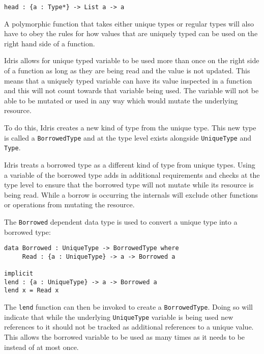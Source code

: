 \documentclass[onehalf,11pt]{beavtex}
\begin{document}
\begin{verbatim}
head : {a : Type*} -> List a -> a
\end{verbatim}

A polymorphic function that takes either unique types or regular types will also
have to obey the rules for how values that are uniquely typed can be used
on the right hand side of a function.


Idris allows for unique typed variable to be used more than once on the right
side of a function as long as they are being read and the value is not
updated.
This means that a uniquely typed variable can have its value inspected in a
function and this will not count towards that variable being used.
The variable will not be able to be mutated or used in any way which would
mutate the underlying resource.

To do this, Idris creates a new kind of type from the unique type.
This new type is called a \texttt{BorrowedType} and at
the type level exists alongside \texttt{UniqueType} and \texttt{Type}.

Idris treats a borrowed type as a different kind of type from unique types.
Using a variable of the borrowed type adds in additional
requirements and checks at the type level to ensure that the borrowed type
will not mutate while its resource is being read.
While a borrow is occurring the internals will exclude other functions or
operations from mutating the resource.

The \texttt{Borrowed} dependent data type is used to convert a unique type into
a borrowed type:

\begin{verbatim}
data Borrowed : UniqueType -> BorrowedType where
     Read : {a : UniqueType} -> a -> Borrowed a

implicit
lend : {a : UniqueType} -> a -> Borrowed a
lend x = Read x
\end{verbatim}

The \texttt{lend} function can then be invoked to create a \texttt{BorrowedType}.
Doing so will indicate that while the underlying \texttt{UniqueType} variable is
being used new references to it should not be tracked as additional references
to a unique value.  This allows the borrowed variable to be used as many times
as it needs to be instead of at most once. 

\end{document}
